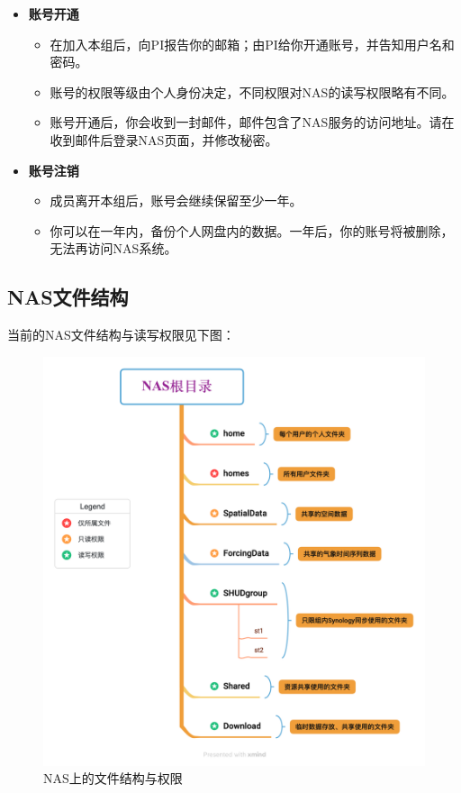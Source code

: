 \documentclass[
]{ctexbook}
\providecommand{\tightlist}{%
  \setlength{\itemsep}{0pt}\setlength{\parskip}{0pt}}
\begin{document}
\begin{itemize}
\item
  \textbf{账号开通}

  \begin{itemize}
  \tightlist
  \item
    在加入本组后，向PI报告你的邮箱；由PI给你开通账号，并告知用户名和密码。
  \item
    账号的权限等级由个人身份决定，不同权限对NAS的读写权限略有不同。
  \item
    账号开通后，你会收到一封邮件，邮件包含了NAS服务的访问地址。请在收到邮件后登录NAS页面，并修改秘密。
  \end{itemize}
\item
  \textbf{账号注销}

  \begin{itemize}
  \tightlist
  \item
    成员离开本组后，账号会继续保留至少一年。
  \item
    你可以在一年内，备份个人网盘内的数据。一年后，你的账号将被删除，无法再访问NAS系统。
  \end{itemize}
\end{itemize}

\hypertarget{nasux6587ux4ef6ux7ed3ux6784}{%
\subsection{NAS文件结构}\label{nasux6587ux4ef6ux7ed3ux6784}}

当前的NAS文件结构与读写权限见下图：

\begin{figure}
\centering
\includegraphics{Fig/ch5/nas_structure.png}
\caption{NAS上的文件结构与权限}
\end{figure}
\end{document}
